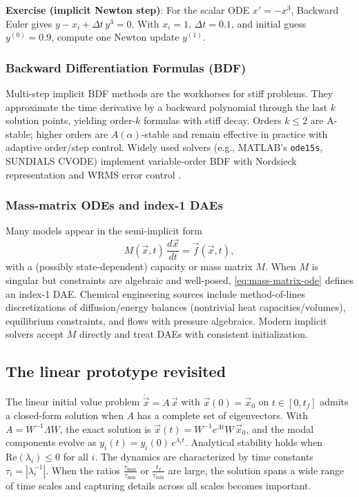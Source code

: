 \begin{exampleBox}
    \textbf{Exercise (implicit Newton step)}: For the scalar ODE $x'=-x^3$, Backward Euler gives $y - x_i + \Delta t\, y^3=0$. With $x_i=1$, $\Delta t=0.1$, and initial guess $y^{(0)}=0.9$, compute one Newton update $y^{(1)}$.
\end{exampleBox}

\subsubsection{Backward Differentiation Formulas (BDF)}
Multi-step implicit BDF methods are the workhorses for stiff problems. They approximate the time derivative by a backward polynomial through the last $k$ solution points, yielding order-$k$ formulas with stiff decay. Orders $k\le 2$ are A-stable; higher orders are $A(\alpha)$-stable and remain effective in practice with adaptive order/step control. Widely used solvers (e.g., MATLAB's \texttt{ode15s}, SUNDIALS CVODE) implement variable-order BDF with Nordsieck representation and WRMS error control \cite{Gear1971BDF,ShampineReichelt1997,Hindmarsh2005SUNDIALS}.

\subsubsection{Mass-matrix ODEs and index-1 DAEs}
Many models appear in the semi-implicit form
\begin{equation}
    M(\vec{x},t)\,\frac{d\vec{x}}{dt} = \vec{f}(\vec{x},t),\label{eq:mass-matrix-ode}
\end{equation}
with a (possibly state-dependent) capacity or mass matrix $M$. When $M$ is singular but constraints are algebraic and well-posed, \autoref{eq:mass-matrix-ode} defines an index-1 DAE. Chemical engineering sources include method-of-lines discretizations of diffusion/energy balances (nontrivial heat capacities/volumes), equilibrium constraints, and flows with pressure algebraics. Modern implicit solvers accept $M$ directly and treat DAEs with consistent initialization.

\subsection{The linear prototype revisited}
\label{subsec:prototype-revisited}
The linear initial value problem $\dot{\vec{x}}=A\,\vec{x}$ with $\vec{x}(0)=\vec{x}_0$ on $t\in[0,t_f]$ admits a closed-form solution when $A$ has a complete set of eigenvectors. With $A=W^{-1}\Lambda W$, the exact solution is $\vec{x}(t)=W^{-1}e^{\Lambda t}W\,\vec{x}_0$, and the modal components evolve as $y_i(t)=y_i(0)\,e^{\lambda_i t}$. Analytical stability holds when $\mathrm{Re}(\lambda_i)\le 0$ for all $i$. The dynamics are characterized by time constants $\tau_i=|\lambda_i^{-1}|$. When the ratios $\tfrac{\tau_{\max}}{\tau_{\min}}$ or $\tfrac{t_f}{\tau_{\min}}$ are large, the solution spans a wide range of time scales and capturing details across all scales becomes important.

